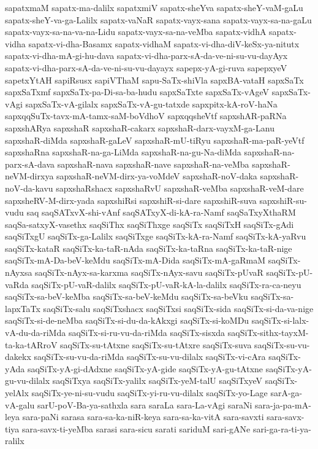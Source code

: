 {sapatxmaM
sapatx-ma-dalilx
sapatxmiV
sapatx-sheYva
sapatx-sheY-vaM-gaLu
sapatx-sheY-va-ga-Lalilx
sapatx-vaNaR
sapatx-vayx-sana
sapatx-vayx-sa-na-gaLu
sapatx-vayx-sa-na-va-na-Lidu
sapatx-vayx-sa-na-veMba
sapatx-vidhA
sapatx-vidha
sapatx-vi-dha-Basamx
sapatx-vidhaM
sapatx-vi-dha-diV-keSx-ya-nitutx
sapatx-vi-dha-mA-gi-hu-dava
sapatx-vi-dha-parx-sA-da-ve-ni-su-vu-dayAyx
sapatx-vi-dha-parx-sA-da-ve-ni-su-vu-dayayx
sapepx-yA-gi-ruva
sapepxyeV
sapetxYtAH
sapiRsusx
sapiVThaM
sapu-SaTx-shiVla
sapxBA-vataH
sapxSaTx
sapxSaTxmf
sapxSaTx-pa-Di-sa-ba-hudu
sapxSaTxte
sapxSaTx-vAgeV
sapxSaTx-vAgi
sapxSaTx-vA-gilalx
sapxSaTx-vA-gu-tatxde
sapxpitx-kA-roV-haNa
sapxqqSuTx-tavx-mA-tamx-saM-boVdhoV
sapxqqsheVtf
sapxshAR-paRNa
sapxshARya
sapxshaR
sapxshaR-cakarx
sapxshaR-darx-vayxM-ga-Lanu
sapxshaR-diMda
sapxshaR-gaLeV
sapxshaR-mU-tiRyu
sapxshaR-ma-paR-yeVtf
sapxshaRna
sapxshaR-na-ga-LiMda
sapxshaR-na-gu-Na-diMda
sapxshaR-na-parx-sA-dava
sapxshaR-nava
sapxshaR-nave
sapxshaR-na-veMba
sapxshaR-neVM-dirxya
sapxshaR-neVM-dirx-ya-voMdeV
sapxshaR-noV-daka
sapxshaR-noV-da-kavu
sapxshaRshacx
sapxshaRvU
sapxshaR-veMba
sapxshaR-veM-dare
sapxsheRV-M-dirx-yada
sapxshiRsi
sapxshiR-si-dare
sapxshiR-suva
sapxshiR-su-vudu
saq
saqSATxvX-shi-vAnf
saqSATxyX-di-kA-ra-Namf
saqSaTxyXthaRM
saqSa-satxyX-vasethx
saqSiThx
saqSiThxge
saqSiTx
saqSiTxH
saqSiTx-gAdi
saqSiTxgU
saqSiTx-ga-Lalilx
saqSiTxge
saqSiTx-kA-ra-Namf
saqSiTx-kA-yaRvu
saqSiTx-kataR
saqSiTx-ka-taR-nAda
saqSiTx-ka-taRna
saqSiTx-ka-taR-nige
saqSiTx-mA-Da-beV-keMdu
saqSiTx-mA-Dida
saqSiTx-mA-gaRmaM
saqSiTx-nAyxsa
saqSiTx-nAyx-sa-karxma
saqSiTx-nAyx-savu
saqSiTx-pUvaR
saqSiTx-pU-vaRda
saqSiTx-pU-vaR-dalilx
saqSiTx-pU-vaR-kA-la-dalilx
saqSiTx-ra-ca-neyu
saqSiTx-sa-beV-keMba
saqSiTx-sa-beV-keMdu
saqSiTx-sa-beVku
saqSiTx-sa-lapxTaTx
saqSiTx-salu
saqSiTxshacx
saqSiTxsi
saqSiTx-sida
saqSiTx-si-da-va-nige
saqSiTx-si-de-neMba
saqSiTx-si-du-da-kAkxgi
saqSiTx-si-koMDu
saqSiTx-si-lalx-vA-du-da-riMda
saqSiTx-si-ru-vu-da-riMda
saqSiTx-sisxda
saqSiTx-sithx-tayxM-ta-ka-tARroV
saqSiTx-su-tAtxne
saqSiTx-su-tAtxre
saqSiTx-suva
saqSiTx-su-vu-dakekx
saqSiTx-su-vu-da-riMda
saqSiTx-su-vu-dilalx
saqSiTx-vi-cAra
saqSiTx-yAda
saqSiTx-yA-gi-dAdxne
saqSiTx-yA-gide
saqSiTx-yA-gu-tAtxne
saqSiTx-yA-gu-vu-dilalx
saqSiTxya
saqSiTx-yalilx
saqSiTx-yeM-talU
saqSiTxyeV
saqSiTx-yelAlx
saqSiTx-ye-ni-su-vudu
saqSiTx-yi-ru-vu-dilalx
saqSiTx-yo-Lage
sarA-ga-vA-galu
sarU-poV-Ba-ya-sathxla
sara
saraLa
sara-La-vAgi
saraNi
sara-ja-pa-mA-leya
sara-paNi
sarasa
sara-sa-ka-niR-keya
sara-sa-ka-vitA
sara-savxti
sara-savx-tiya
sara-savx-ti-yeMba
sarasi
sara-sicu
sarati
sariduM
sari-gANe
sari-ga-ra-ti-ya-ralilx
}
